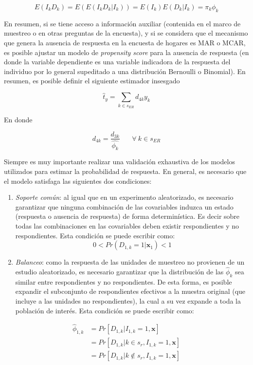 \documentclass[
  12pt,
  spanish,
]{book}
\providecommand{\tightlist}{%
  \setlength{\itemsep}{0pt}\setlength{\parskip}{0pt}}
\begin{document}
\[
E(I_kD_k) 
= E\left(E(I_kD_k|I_k) \right)
= E(I_k)E(D_k|I_k) = \pi_k \phi_k
\]

En resumen, si se tiene acceso a información auxiliar (contenida en el marco de muestreo o en otras preguntas de la encuesta), y si se considera que el mecanismo que genera la ausencia de respuesta en la encuesta de hogares es MAR o MCAR, es posible ajustar un modelo de \emph{propensity score} para la ausencia de respuesta (en donde la variable dependiente es una variable indicadora de la respuesta del individuo por lo general supeditado a una distribución Bernoulli o Binomial). En resumen, es posible definir el siguiente estimador insesgado

\[
\hat{t}_y=\sum_{k\in s_{ER}}d_{4k}y_k
\]

En donde

\[
d_{4k} = \frac{d_{3k}}{\hat{\phi_k}}  \ \ \ \ \ \ \ \ \forall \ k  \in s_{ER}
\]

Siempre es muy importante realizar una validación exhaustiva de los modelos utilizados para estimar la probabilidad de respuesta. En general, es necesario que el modelo satisfaga las siguientes dos condiciones:

\begin{enumerate}
\def\labelenumi{\arabic{enumi}.}
\tightlist
\item
  \emph{Soporte común}: al igual que en un experimento aleatorizado, es necesario garantizar que ninguna combinación de las covariables induzca un estado (respuesta o ausencia de respuesta) de forma determinística. Es decir sobre todas las combinaciones en las covariables deben existir respondientes y no respondientes. Esta condición se puede escribir como:
  \[
  0 < Pr(D_{1,k} = 1 |\mathbf{x}_{1}) < 1 
  \]
\item
  \emph{Balanceo}: como la respuesta de las unidades de muestreo no provienen de un estudio aleatorizado, es necesario garantizar que la distribución de las \(\hat\phi_k\) sea similar entre respondientes y no respondientes. De esta forma, es posible expandir el subconjunto de respondientes efectivos a la muestra original (que incluye a las unidades no respondientes), la cual a su vez expande a toda la población de interés. Esta condición se puede escribir como:
\end{enumerate}

\begin{align*}
\hat\phi_{1, k} &= Pr[D_{1, k} | I_{1, k} = 1,\mathbf{x}] \\
&= Pr[D_{1, k} | k \in s_r, I_{1, k} = 1, \mathbf{x}] \\
&= Pr[D_{1, k} | k \notin s_r, I_{1, k} = 1, \mathbf{x}]
\end{align*}
\end{document}
